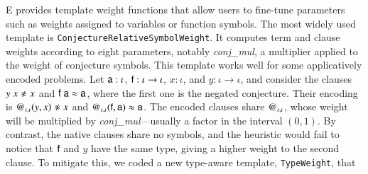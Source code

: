   E provides template weight functions that allow users to fine-tune parameters
  such as weights assigned to variables or function symbols. The most widely
  used template is \texttt{ConjectureRelativeSymbolWeight}. It computes term and clause weights according to
  eight parameters, notably \textit{conj\_mul}, a multiplier
  applied to the weight of conjecture symbols.
  This template works well for some applicatively encoded problems.
  Let $\mathsf{a} : \iota$, $\mathsf{f} : \iota \to \iota$, $x : \iota$, and $y :
  \iota \to \iota$, and consider the clauses
  $y \; x \noteq x$ and
  $\mathsf{f} \; \mathsf{a} \approx \mathsf{a}$,
  where the first one is the negated conjecture. Their encoding
  is
  $\cst{@}_{\iota,\iota}(y, x) \noteq x$ and
  $\mathsf{@}_{\iota,\iota}(\mathsf{f}, \mathsf{a}) \approx \mathsf{a}$.
  The encoded clauses share $\mathsf{@}_{\iota,\iota}$, whose weight
  will be multiplied by \textit{conj\_mul}---usually a factor in the
  interval $(0, 1)$. By contrast, the native \lfhol{} clauses share no symbols,
  and the heuristic would fail to notice that $\mathsf{f}$ and $y$ have the same
  type, giving a higher weight to the second clause.
  To mitigate this, we coded a new type-aware template,
  \CRS\texttt{TypeWeight}, that
